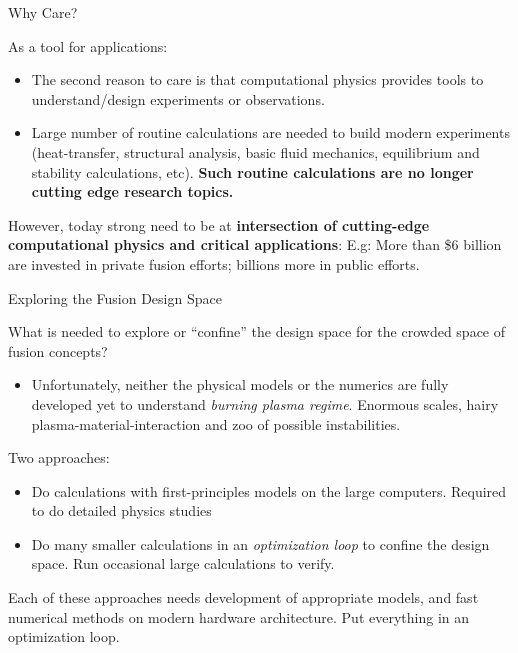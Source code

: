 \documentclass[aspectratio=43]{beamer}
\newcommand{\mypause}{\pause}
\begin{document}
\begin{frame}{Why Care?}

  As a tool for applications:
  \begin{itemize}
  \item The second reason to care is that computational physics
    provides tools to understand/design experiments or observations.
  \item {Large number of routine calculations are needed to build
      modern experiments (heat-transfer, structural analysis, basic
      fluid mechanics, equilibrium and stability calculations,
      etc). {\bf Such routine calculations are no longer cutting edge
        research topics.}}
  \end{itemize}
  \mypause%
  \vskip0.1in%
  However, today strong need to be at {\bf intersection of
    cutting-edge computational physics and critical applications}:
  E.g: More than \$6 billion are invested in private fusion efforts;
  billions more in public efforts.
\end{frame}

\begin{frame}{Exploring the Fusion Design Space}

  What is needed to explore or ``confine'' the design space for the
  crowded space of fusion concepts?

  \begin{itemize}
  \item Unfortunately, neither the physical models or the numerics are
    fully developed yet to understand \emph{burning plasma
      regime}. Enormous scales, hairy plasma-material-interaction and
    zoo of possible instabilities.
  \end{itemize}
  \mypause%
  Two approaches: 
  \begin{itemize}  
  \item Do calculations with first-principles models on the large
    computers. Required to do detailed physics studies%
    \mypause%
  \item Do many smaller calculations in an \emph{optimization loop} to
    confine the design space. Run occasional large calculations to
    verify.
  \end{itemize}

  Each of these approaches needs development of appropriate models,
  and fast numerical methods on modern hardware architecture. Put
  everything in an optimization loop.

\end{frame}
\end{document}
